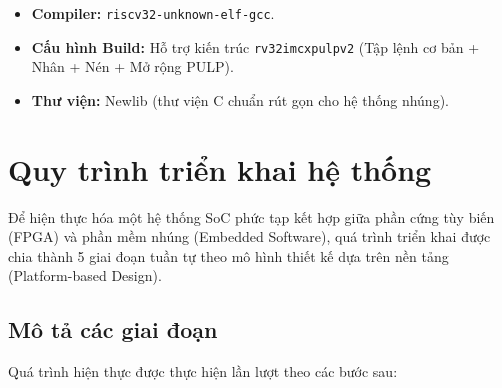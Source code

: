 \begin{itemize}
    \item \textbf{Compiler:} \texttt{riscv32-unknown-elf-gcc}.
    \item \textbf{Cấu hình Build:} Hỗ trợ kiến trúc \texttt{rv32imcxpulpv2} 
    (Tập lệnh cơ bản + Nhân + Nén + Mở rộng PULP).
    \item \textbf{Thư viện:} Newlib (thư viện C chuẩn rút gọn cho hệ thống nhúng).
\end{itemize}

%
\section{Quy trình triển khai hệ thống}
\label{sec:workflow}

Để hiện thực hóa một hệ thống SoC phức tạp kết hợp giữa phần cứng tùy biến (FPGA) 
và phần mềm nhúng (Embedded Software), quá trình triển khai được chia thành 
5 giai đoạn tuần tự theo mô hình thiết kế dựa trên nền tảng (Platform-based Design). 

\subsection{Mô tả các giai đoạn}

Quá trình hiện thực được thực hiện lần lượt theo các bước sau:

